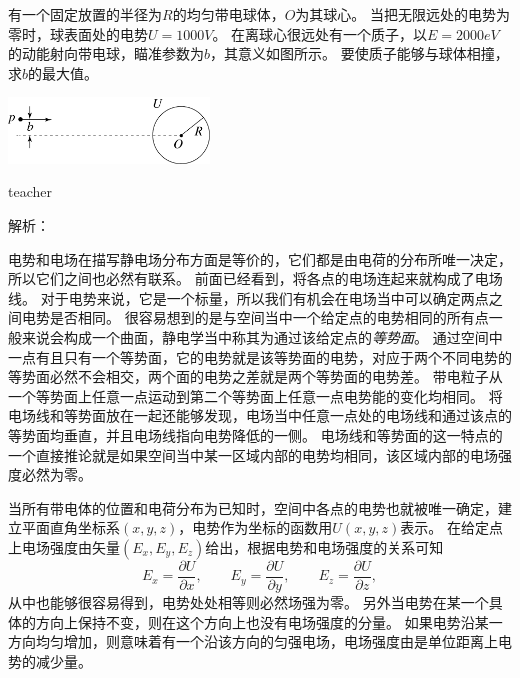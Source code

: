 \begin{example}
有一个固定放置的半径为$R$的均匀带电球体，$O$为其球心。
当把无限远处的电势为零时，球表面处的电势$U=1000\unit{V}$。
在离球心很远处有一个质子，以$E = 2000\unit{eV}$的动能射向带电球，瞄准参数为$b$，其意义如图所示。
要使质子能够与球体相撞，求$b$的最大值。
\begin{flushright}
\includegraphics[width=0.4\textwidth]{images/elec-problem-8.pdf}
\end{flushright}
\begin{taggedblock}{teacher}

解析：
\end{taggedblock}
\end{example}

电势和电场在描写静电场分布方面是等价的，它们都是由电荷的分布所唯一决定，所以它们之间也必然有联系。
前面已经看到，将各点的电场连起来就构成了电场线。
对于电势来说，它是一个标量，所以我们有机会在电场当中可以确定两点之间电势是否相同。
很容易想到的是与空间当中一个给定点的电势相同的所有点一般来说会构成一个曲面，静电学当中称其为通过该给定点的\emph{等势面}。
通过空间中一点有且只有一个等势面，它的电势就是该等势面的电势，对应于两个不同电势的等势面必然不会相交，两个面的电势之差就是两个等势面的电势差。
带电粒子从一个等势面上任意一点运动到第二个等势面上任意一点电势能的变化均相同。
将电场线和等势面放在一起还能够发现，电场当中任意一点处的电场线和通过该点的等势面均垂直，并且电场线指向电势降低的一侧。
电场线和等势面的这一特点的一个直接推论就是如果空间当中某一区域内部的电势均相同，该区域内部的电场强度必然为零。

当所有带电体的位置和电荷分布为已知时，空间中各点的电势也就被唯一确定，建立平面直角坐标系$(x,y,z)$，电势作为坐标的函数用$U(x,y,z)$表示。
在给定点上电场强度由矢量$(E_x,E_y,E_z)$给出，根据电势和电场强度的关系可知
\begin{equation}
E_x = \frac{\partial U}{\partial x},\qquad E_y = \frac{\partial U}{\partial y},\qquad E_z = \frac{\partial U}{\partial z},
\end{equation}
从中也能够很容易得到，电势处处相等则必然场强为零。
另外当电势在某一个具体的方向上保持不变，则在这个方向上也没有电场强度的分量。
如果电势沿某一方向均匀增加，则意味着有一个沿该方向的匀强电场，电场强度由是单位距离上电势的减少量。

